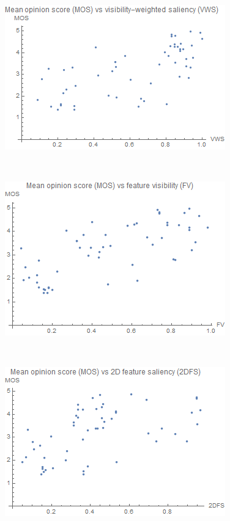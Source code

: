 \begin{figure}
	\centering
	\begin{minipage}{.33\textwidth}
		\includegraphics[width=1\linewidth]{images/mos_vs_vws.png}
	\end{minipage}~
	\begin{minipage}{.33\textwidth}
		\includegraphics[width=1\linewidth]{images/mos_vs_visibility}
	\end{minipage}~
	\begin{minipage}{.33\textwidth}
		\includegraphics[width=1\linewidth]{images/mos_vs_2dfs}

\end{minipage}
\end{figure}
